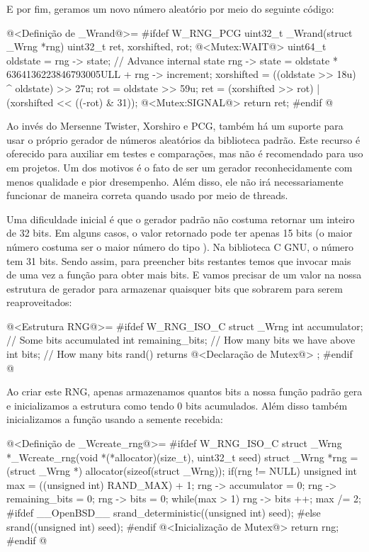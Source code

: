 E por fim, geramos um novo número aleatório por meio do seguinte código:

\iniciocodigo
@<Definição de \_Wrand@>=
#ifdef W_RNG_PCG
uint32_t _Wrand(struct _Wrng *rng){
  uint32_t ret, xorshifted, rot;
  @<Mutex:WAIT@>
  uint64_t oldstate = rng -> state;
  // Advance internal state
  rng -> state = oldstate * 6364136223846793005ULL + rng -> increment;
  xorshifted = ((oldstate >> 18u) ^ oldstate) >> 27u;
  rot = oldstate >> 59u;
  ret = (xorshifted >> rot) | (xorshifted << ((-rot) & 31));
  @<Mutex:SIGNAL@>
  return ret;
}
#endif
@
\fimcodigo


Ao invés do Mersenne Twister, Xorshiro e PCG, também há um suporte
para usar o próprio gerador de números aleatórios da biblioteca
padrão. Este recurso é oferecido para auxiliar em testes e
comparações, mas não é recomendado para uso em projetos. Um dos
motivos é o fato de ser um gerador reconhecidamente com menos
qualidade e pior dresempenho. Além disso, ele não irá necessariamente
funcionar de maneira correta quando usado por meio de threads.

Uma dificuldade inicial é que o gerador padrão não costuma retornar um
inteiro de 32 bits. Em alguns casos, o valor retornado pode ter apenas
15 bits (o maior número costuma ser o maior número do
tipo ). Na biblioteca C GNU, o número tem 31
bits. Sendo assim, para preencher bits restantes temos que invocar
mais de uma vez a função para obter mais bits. E vamos precisar de um
valor na nossa estrutura de gerador para armazenar quaisquer bits que
sobrarem para serem reaproveitados:

\iniciocodigo
@<Estrutura RNG@>=
#ifdef W_RNG_ISO_C
struct _Wrng{
  int accumulator;     // Some bits accumulated
  int remaining_bits;  // How many bits we have above
  int bits;            // How many bits rand() returns
  @<Declaração de Mutex@>
};
#endif
@
\fimcodigo

Ao criar este RNG, apenas armazenamos quantos bits a nossa função
padrão gera e inicializamos a estrutura como tendo 0 bits
acumulados. Além disso também inicializamos a função usando a semente
recebida:

\iniciocodigo
@<Definição de \_Wcreate\_rng@>=
#ifdef W_RNG_ISO_C
struct _Wrng *_Wcreate_rng(void *(*allocator)(size_t), uint32_t seed){
  struct _Wrng *rng = (struct _Wrng *) allocator(sizeof(struct _Wrng));
  if(rng != NULL){
    unsigned int max = ((unsigned int) RAND_MAX) + 1;
    rng -> accumulator = 0;
    rng -> remaining_bits = 0;
    rng -> bits = 0;
    while(max > 1){
      rng -> bits ++;
      max /= 2;
    }
#ifdef __OpenBSD__
    srand_deterministic((unsigned int) seed);
#else
    srand((unsigned int) seed);
#endif
    @<Inicialização de Mutex@>
  }
  return rng;
}
#endif
@
\fimcodigo

